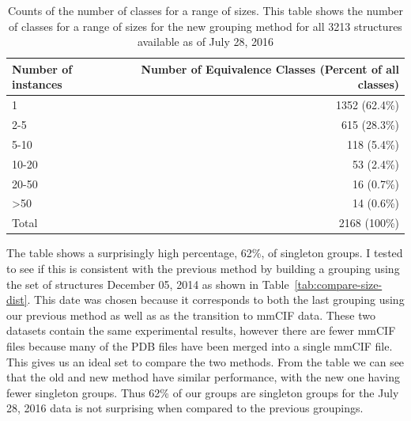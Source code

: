 \begin{table}
  \begin{tabular}{lr}
    \toprule
    Number of instances & Number of Equivalence Classes (Percent of all classes) \\
    \midrule
    1               & 1352 (62.4\%) \\
    2-5             & 615 (28.3\%)  \\
    5-10            & 118 (5.4\%)   \\
    10-20           & 53 (2.4\%)    \\
    20-50           & 16 (0.7\%)    \\
    \textgreater 50 & 14 (0.6\%)    \\
    Total           & 2168 (100\%)  \\
    \bottomrule
  \end{tabular}
  \caption{Counts of the number of classes for a range of sizes. This table
    shows the number of classes for a range of sizes for the new grouping method
  for all 3213 structures available as of July 28, 2016}
  \label{tab:eq-size-dist}
\end{table}

The table shows a surprisingly high percentage, 62\%, of singleton groups. I
tested to see if this is consistent with the previous method by building a
grouping using the set of structures December 05, 2014 as shown in
Table~\ref{tab:compare-size-dist}. This date was chosen because it corresponds
to both the last grouping using our previous method as well as as the transition
to mmCIF data. These two datasets contain the same experimental results, however
there are fewer mmCIF files because many  of the PDB files have been merged into
a single mmCIF file. This gives us an ideal set to compare the two methods. From
the table we can see that the old and new method have similar performance, with
the new one having fewer singleton groups. Thus 62\% of our groups are singleton
groups for the July 28, 2016 data is not surprising when compared to the
previous groupings.

